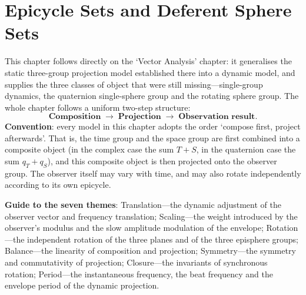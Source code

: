 \chapter{Epicycle Sets and Deferent Sphere Sets}
\label{chap:dyn_epicycle}

\begin{remark}\label{rem:dyn_chapter_positioning}
This chapter follows directly on the `Vector Analysis' chapter: it generalises the static three-group projection model established there into a dynamic model, and supplies the three classes of object that were still missing---single-group dynamics, the quaternion single-sphere group and the rotating sphere group. The whole chapter follows a uniform two-step structure:
\[
\textbf{Composition} \;\longrightarrow\; \textbf{Projection} \;\longrightarrow\; \textbf{Observation result}.
\]
\textbf{Convention}: every model in this chapter adopts the order `compose first, project afterwards'. That is, the time group and the space group are first combined into a composite object (in the complex case the sum $T+S$, in the quaternion case the sum $q_T+q_S$), and this composite object is then projected onto the observer group. The observer itself may vary with time, and may also rotate independently according to its own epicycle.

\textbf{Guide to the seven themes}: Translation---the dynamic adjustment of the observer vector and frequency translation; Scaling---the weight introduced by the observer's modulus and the slow amplitude modulation of the envelope; Rotation---the independent rotation of the three planes and of the three episphere groups; Balance---the linearity of composition and projection; Symmetry---the symmetry and commutativity of projection; Closure---the invariants of synchronous rotation; Period---the instantaneous frequency, the beat frequency and the envelope period of the dynamic projection.
\end{remark}

